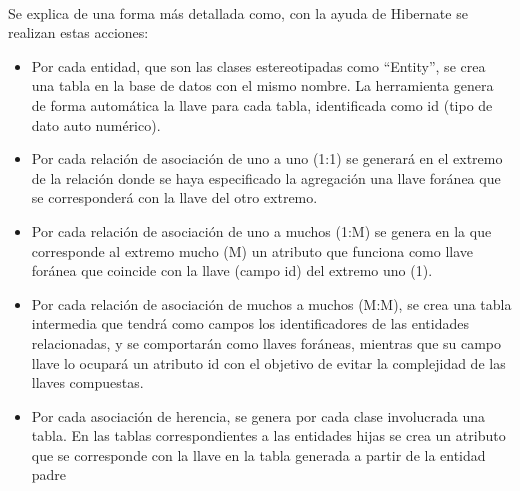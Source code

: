 \paragraph{}Se explica de una forma más detallada como, con la ayuda de Hibernate se realizan estas acciones:
\begin{itemize}
	\item Por cada entidad, que son las clases estereotipadas como “Entity”, se crea una tabla en la base de datos con el mismo nombre. La herramienta genera de forma automática la llave para cada tabla, identificada como id (tipo de dato auto numérico).
	\item Por cada relación de asociación de uno a uno (1:1) se generará en el extremo de la	relación donde se haya especificado la agregación una llave foránea que se	corresponderá con la llave del otro extremo.
	\item Por cada relación de asociación de uno a muchos (1:M) se genera en la que	corresponde al extremo mucho (M) un atributo que funciona como llave foránea que	coincide con la llave (campo id) del extremo uno (1).
	\item Por cada relación de asociación de muchos a muchos (M:M), se crea una tabla	intermedia que tendrá como campos los identificadores de las entidades	relacionadas, y se comportarán como llaves foráneas, mientras que su campo llave	lo ocupará un atributo id con el objetivo de evitar la complejidad de las llaves	compuestas.
	\item Por cada asociación de herencia, se genera por cada clase involucrada una tabla. En las tablas correspondientes a las entidades hijas se crea un atributo que se corresponde con la llave en la tabla generada a partir de la entidad padre
\end{itemize}

